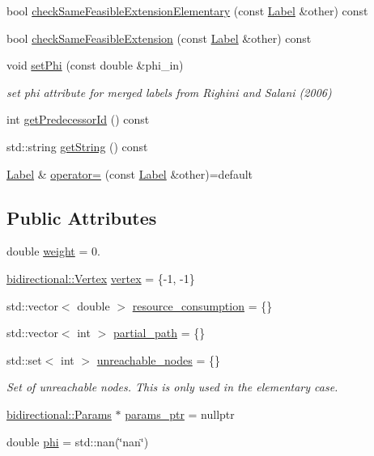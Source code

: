 \begin{DoxyCompactItemize}
\item 
bool \hyperlink{classlabelling_1_1Label_a333b6fc9dba864b3df2cdf530a055aa7}{check\+Same\+Feasible\+Extension\+Elementary} (const \hyperlink{classlabelling_1_1Label}{Label} \&other) const
\item 
bool \hyperlink{classlabelling_1_1Label_a02179d540444a13aa7cc3355d0a461b8}{check\+Same\+Feasible\+Extension} (const \hyperlink{classlabelling_1_1Label}{Label} \&other) const
\item 
void \hyperlink{classlabelling_1_1Label_afffea46e29dc7074edd10470c5dfeb87}{set\+Phi} (const double \&phi\+\_\+in)
\begin{DoxyCompactList}\small\item\em set phi attribute for merged labels from Righini and Salani (2006) \end{DoxyCompactList}\item 
int \hyperlink{classlabelling_1_1Label_a676337cc2e66ddaba088c736b9220651}{get\+Predecessor\+Id} () const
\item 
std\+::string \hyperlink{classlabelling_1_1Label_adc93c3a59a853bc559bb63e8df1ae67e}{get\+String} () const
\item 
\hyperlink{classlabelling_1_1Label}{Label} \& \hyperlink{classlabelling_1_1Label_a96fec70e1378988bb3d01f3aee8ab676}{operator=} (const \hyperlink{classlabelling_1_1Label}{Label} \&other)=default
\end{DoxyCompactItemize}
\subsection*{Public Attributes}
\begin{DoxyCompactItemize}
\item 
double \hyperlink{classlabelling_1_1Label_a478f34a67528586877720483c5f0d38b}{weight} = 0.
\item 
\hyperlink{structbidirectional_1_1Vertex}{bidirectional\+::\+Vertex} \hyperlink{classlabelling_1_1Label_a7c8972ee9d1c00fd348025c321467f75}{vertex} = \{-\/1, -\/1\}
\item 
std\+::vector$<$ double $>$ \hyperlink{classlabelling_1_1Label_a2c185387fad46a29bce3dd99b111a1c4}{resource\+\_\+consumption} = \{\}
\item 
std\+::vector$<$ int $>$ \hyperlink{classlabelling_1_1Label_a7511d29a3aa0272b1a0e1ea5fb75ff14}{partial\+\_\+path} = \{\}
\item 
std\+::set$<$ int $>$ \hyperlink{classlabelling_1_1Label_ae684804e463fe690b4fe6ee32812e123}{unreachable\+\_\+nodes} = \{\}
\begin{DoxyCompactList}\small\item\em Set of unreachable nodes. This is only used in the elementary case. \end{DoxyCompactList}\item 
\hyperlink{classbidirectional_1_1Params}{bidirectional\+::\+Params} $\ast$ \hyperlink{classlabelling_1_1Label_a182759fd08c2536f9e6a2614c790b127}{params\+\_\+ptr} = nullptr
\item 
double \hyperlink{classlabelling_1_1Label_a632cd90937f05a8ea69ad60d4c103c66}{phi} = std\+::nan(\char`\"{}nan\char`\"{})
\end{DoxyCompactItemize}
